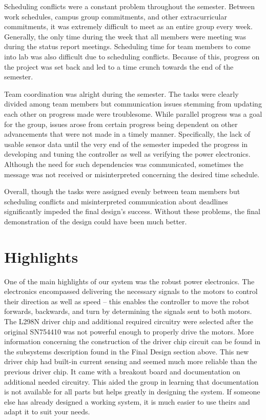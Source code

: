 \documentclass[11pt]{report}
\begin{document}
\begin{spacing}{1.5}
    Scheduling conflicts were a constant problem throughout the semester. Between work schedules, campus group commitments, and other extracurricular commitments, it was extremely difficult to meet as an entire group every week. Generally, the only time during the week that all members were meeting was during the status report meetings. Scheduling time for team members to come into lab was also difficult due to scheduling conflicts. Because of this, progress on the project was set back and led to a time crunch towards the end of the semester. 
    
    Team coordination was alright during the semester. The tasks were clearly divided among team members but communication issues stemming from updating each other on progress made were troublesome. While parallel progress was a goal for the group, issues arose from certain progress being dependent on other advancements that were not made in a timely manner. Specifically, the lack of usable sensor data until the very end of the semester impeded the progress in developing and tuning the controller as well as verifying the power electronics. Although the need for such dependencies was communicated, sometimes the message was not received or misinterpreted concerning the desired time schedule.
    
    Overall, though the tasks were assigned evenly between team members but scheduling conflicts and misinterpreted communication about deadlines significantly impeded the final design’s success. Without these problems, the final demonstration of the design could have been much better.

\section*{Highlights}

One of the main highlights of our system was the robust power electronics. The electronics encompassed delivering the necessary signals to the motors to control their direction as well as speed – this enables the controller to move the robot forwards, backwards, and turn by determining the signals sent to both motors. The L298N driver chip and additional required circuitry were selected after the original SN754410 was not powerful enough to properly drive the motors. More information concerning the construction of the driver chip circuit can be found in the subsystems description found in the Final Design section above. This new driver chip had built-in current sensing and seemed much more reliable than the previous driver chip. It came with a breakout board and documentation on additional needed circuitry. This aided the group in learning that documentation is not available for all parts but helps greatly in designing the system. If someone else has already designed a working system, it is much easier to use theirs and adapt it to suit your needs. 


\end{spacing}
\end{document}
